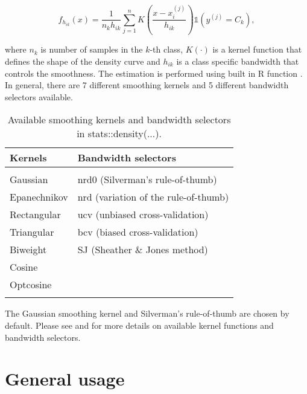 \documentclass{article}\usepackage[]{graphicx}\usepackage[]{color}
\begin{document}
$$\hat{f}_{h_{ik}}(x) = \frac{1}{n_{k}h_{ik}}\sum_{j=1}^nK\left(\frac{x - x_i^{(j)}}{h_{ik}}\right)\mathbb{1}(y^{(j)} = C_k),$$

where $n_k$ is number of samples in the $k$-th class, $K(\cdot)$ is a kernel function that defines the shape of the density curve and $h_{ik}$ is a class specific bandwidth that controls the smoothness. The estimation is performed using built in R function \textcolor{darkgreen}{{}}.  In general, there are 7 different smoothing kernels and 5 different bandwidth selectors available.

\begin{table}[!htbp] \centering
\caption{Available smoothing kernels and bandwidth selectors in stats::density(...).}
\begin{tabular}{ll}
\hline %
\textbf{Kernels} & \textbf{Bandwidth selectors}         \\ \hline \\[-1.8ex]
Gaussian                               & nrd0 (Silverman's rule-of-thumb)                  \\
Epanechnikov                           & nrd (variation of the rule-of-thumb)              \\
Rectangular                            & ucv (unbiased cross-validation)                   \\
Triangular                             & bcv (biased cross-validation)                     \\
Biweight                               & SJ (Sheather \& Jones method)                     \\
Cosine                                 &                                                   \\
Optcosine                              &                                                   \\
\hline \\[-1.8ex]
\end{tabular}%
\end{table}

The Gaussian smoothing kernel and Silverman's rule-of-thumb are chosen by default. Please see \textcolor{darkgreen}{{}} and \textcolor{darkgreen}{{}} for more details on available kernel functions and bandwidth selectors.

\section{General usage}
\end{document}
